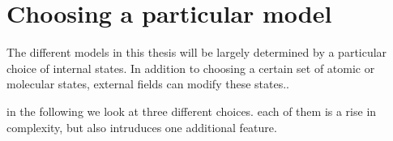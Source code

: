 

\section{Choosing a particular model}
The different models in this thesis will be largely determined by a particular choice of internal states.
In addition to choosing a certain set of atomic or molecular states, external fields can modify these states..

in the following we look at three different choices. each of them is a rise in complexity, but also intruduces one additional feature.




